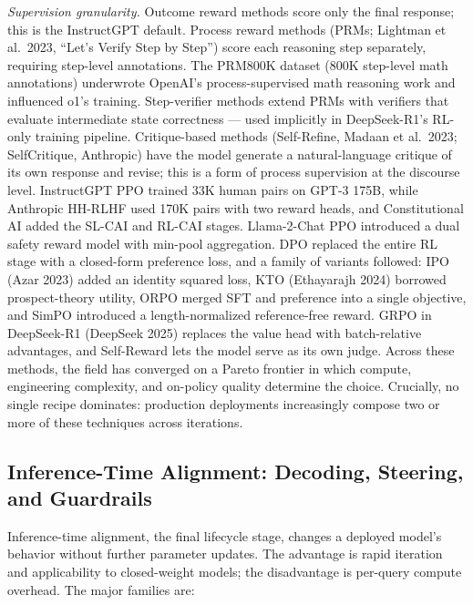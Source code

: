 \documentclass{article}
\begin{document}
\emph{Supervision granularity.} Outcome reward methods score only the final response; this is the InstructGPT default. Process reward methods (PRMs; Lightman et al.~2023, ``Let's Verify Step by Step'') score each reasoning step separately, requiring step-level annotations. The PRM800K dataset (800K step-level math annotations) underwrote OpenAI's process-supervised math reasoning work and influenced o1's training. Step-verifier methods extend PRMs with verifiers that evaluate intermediate state correctness --- used implicitly in DeepSeek-R1's RL-only training pipeline. Critique-based methods (Self-Refine, Madaan et al.~2023; SelfCritique, Anthropic) have the model generate a natural-language critique of its own response and revise; this is a form of process supervision at the discourse level. InstructGPT PPO \citep{ouyang20222022} trained 33K human pairs on GPT-3 175B, while Anthropic HH-RLHF \citep{bai20222022} used 170K pairs with two reward heads, and Constitutional AI \citep{bai20222022} added the SL-CAI and RL-CAI stages. Llama-2-Chat PPO \citep{touvron20232023} introduced a dual safety reward model with min-pool aggregation. DPO \citep{rafailov2023directpreferenceop} replaced the entire RL stage with a closed-form preference loss, and a family of variants followed: IPO (Azar 2023) added an identity squared loss, KTO (Ethayarajh 2024) borrowed prospect-theory utility, ORPO \citep{hong2024orpomonolithicpref} merged SFT and preference into a single objective, and SimPO \citep{meng2024simposimpleprefere} introduced a length-normalized reference-free reward. GRPO in DeepSeek-R1 (DeepSeek 2025) replaces the value head with batch-relative advantages, and Self-Reward \citep{yuan2023rrhfrankresponsest} lets the model serve as its own judge. Across these methods, the field has converged on a Pareto frontier in which compute, engineering complexity, and on-policy quality determine the choice. Crucially, no single recipe dominates: production deployments increasingly compose two or more of these techniques across iterations.

\subsection{Inference-Time Alignment: Decoding, Steering, and Guardrails}\label{inference-time-alignment-decoding-steering-and-guardrails}

Inference-time alignment, the final lifecycle stage, changes a deployed model's behavior without further parameter updates. The advantage is rapid iteration and applicability to closed-weight models; the disadvantage is per-query compute overhead. The major families are:
\end{document}
